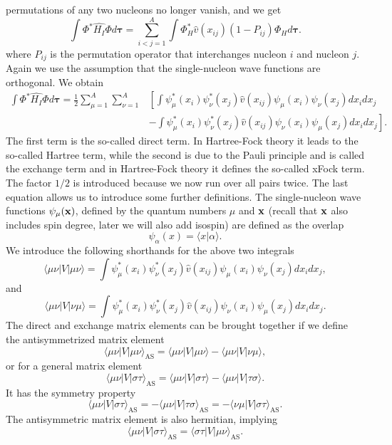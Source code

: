 permutations of any two nucleons no longer vanish, and we get
\begin{equation*}
  \int \Phi^*\hat{H_I}\Phi d\mathbf{\tau} = \sum_{i < j=1}^A \int
  \Phi_H^*\hat{v}(x_{ij})(1-P_{ij})\Phi_H d\mathbf{\tau}.
\end{equation*}
where $P_{ij}$ is the permutation operator that interchanges nucleon
$i$ and nucleon $j$. Again we use the assumption that the
single-nucleon wave functions are orthogonal.  We obtain
\begin{equation}
\begin{split}
  \int \Phi^*\hat{H_I}\Phi d\mathbf{\tau} =
  \frac{1}{2}\sum_{\mu=1}^A\sum_{\nu=1}^A &\left[ \int
    \psi_{\mu}^*(x_i)\psi_{\nu}^*(x_j)\hat{v}(x_{ij})\psi_{\mu}(x_i)\psi_{\nu}(x_j)
    dx_idx_j \right.\\ &\left.  - \int
    \psi_{\mu}^*(x_i)\psi_{\nu}^*(x_j)
    \hat{v}(x_{ij})\psi_{\nu}(x_i)\psi_{\mu}(x_j) dx_idx_j
    \right]. \label{H2Expectation}
\end{split}
\end{equation}
The first term is the so-called direct term. In Hartree-Fock theory it
leads to the so-called Hartree term, while the second is due to the
Pauli principle and is called the exchange term and in Hartree-Fock
theory it defines the so-called xFock term.  The factor $1/2$ is
introduced because we now run over all pairs twice.  The last equation
allows us to introduce some further definitions.  The single-nucleon
wave functions $\psi_{\mu}({\bf x})$, defined by the quantum numbers
$\mu$ and ${\bf x}$ (recall that ${\bf x}$ also includes spin degree,
later we will also add isospin) are defined as the overlap
\[
   \psi_{\alpha}(x) = \langle x | \alpha \rangle .
\]
We introduce the following shorthands for the above two integrals
\[
\langle \mu\nu|V|\mu\nu\rangle = \int
\psi_{\mu}^*(x_i)\psi_{\nu}^*(x_j)\hat{v}(x_{ij})\psi_{\mu}(x_i)\psi_{\nu}(x_j)
dx_idx_j,
\]
and
\[
\langle \mu\nu|V|\nu\mu\rangle = \int
\psi_{\mu}^*(x_i)\psi_{\nu}^*(x_j)
\hat{v}(x_{ij})\psi_{\nu}(x_i)\psi_{\mu}(x_j) dx_idx_j.
\]
The direct and exchange matrix elements can be brought together if we
define the antisymmetrized matrix element
\[
\langle \mu\nu|V|\mu\nu\rangle_{\mathrm{AS}}= \langle
\mu\nu|V|\mu\nu\rangle-\langle \mu\nu|V|\nu\mu\rangle,
\]
or for a general matrix element
\[
\langle \mu\nu|V|\sigma\tau\rangle_{\mathrm{AS}}= \langle
\mu\nu|V|\sigma\tau\rangle-\langle \mu\nu|V|\tau\sigma\rangle.
\]
It has the symmetry property
\[
\langle \mu\nu|V|\sigma\tau\rangle_{\mathrm{AS}}= -\langle
\mu\nu|V|\tau\sigma\rangle_{\mathrm{AS}}=-\langle
\nu\mu|V|\sigma\tau\rangle_{\mathrm{AS}}.
\]
The antisymmetric matrix element is also hermitian, implying
\[
\langle \mu\nu|V|\sigma\tau\rangle_{\mathrm{AS}}= \langle
\sigma\tau|V|\mu\nu\rangle_{\mathrm{AS}}.
\]

